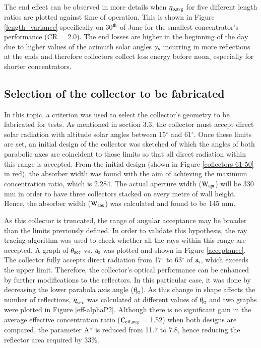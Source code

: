 The end effect can be observed in more details when ${\rm \eta_{o,avg}}$ for five different length ratios are plotted against time of operation. This is shown in Figure \ref{length_variance} specifically on 30$^{\rm th}$ of June for the smallest concentrator's performance (CR = 2.0). The end losses are higher in the beginning of the day due to higher values of the azimuth solar angles $\gamma_{\rm s}$ incurring in more reflections at the ends and therefore collectors collect less energy before noon, especially for shorter concentrators. 


\subsection{Selection of the collector to be fabricated}

In this topic, a criterion was used to select the collector's geometry to be fabricated for tests. As mentioned in section 3.3, the collector must accept direct solar radiation with altitude solar angles between 15$^{\circ}$ and 61$^{\circ}$. Once these limits are set, an initial design of the collector was sketched of which the angles of both parabolic axes are coincident to those limits so that all direct radiation within this range is accepted. From the initial design (shown in Figure \ref{collectors-61-50} in red), the absorber width was found with the aim of achieving the maximum concentration ratio, which is 2.284. The actual aperture width ($\rm{W_{apt}}$) will be 330 mm in order to have three collectors stacked on every metre of wall height. Hence, the absorber width ($\rm{W_{abs}}$) was calculated and found to be 145 mm.


As this collector is truncated, the range of angular acceptance may be broader than the limits previously defined. In order to validate this hypothesis, the ray tracing algorithm was used to check whether all the rays within this range are accepted. A graph of $\theta_{\rm{acc}}$ vs. ${\rm{a_s}}$ was plotted and shown in Figure \ref{acceptance}. The collector fully accepts direct radiation from 17$^{\circ}$ to 63$^{\circ}$ of ${\rm{a_s}}$, which exceeds the upper limit. Therefore, the collector's optical performance can be enhanced by further modifications to the reflectors. In this particular case, it was done by decreasing the lower parabola axis angle ($\theta_{\!_{\rm{P2}}}$). As this change in shape affects the number of reflections, $\rm{\eta_{\!_{o,avg}}}$ was calculated at different values of $\theta_{\!_{\rm{P2}}}$ and two graphs were plotted in Figure \ref{eff-alphaP2}. Although there is no significant gain in the average effective concentration ratio ($\rm{C_{eff,avg}}$ = 1.52) when both designs are compared, the parameter A* is reduced from 11.7 to 7.8, hence reducing the reflector area required by 33\%.

